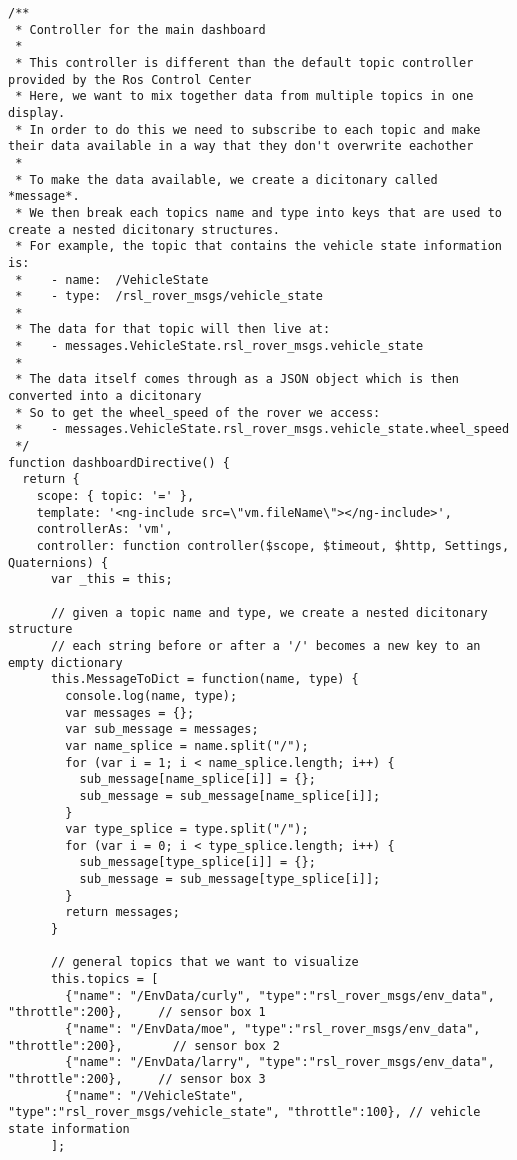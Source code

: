 \begin{lstlisting}[breaklines=true,basicstyle=\tiny]
/**
 * Controller for the main dashboard
 *
 * This controller is different than the default topic controller provided by the Ros Control Center
 * Here, we want to mix together data from multiple topics in one display.
 * In order to do this we need to subscribe to each topic and make their data available in a way that they don't overwrite eachother
 *
 * To make the data available, we create a dicitonary called *message*.
 * We then break each topics name and type into keys that are used to create a nested dicitonary structures.
 * For example, the topic that contains the vehicle state information is:
 *    - name:  /VehicleState
 *    - type:  /rsl_rover_msgs/vehicle_state
 *
 * The data for that topic will then live at:
 *    - messages.VehicleState.rsl_rover_msgs.vehicle_state
 *
 * The data itself comes through as a JSON object which is then converted into a dicitonary
 * So to get the wheel_speed of the rover we access:
 *    - messages.VehicleState.rsl_rover_msgs.vehicle_state.wheel_speed
 */
function dashboardDirective() {
  return {
    scope: { topic: '=' },
    template: '<ng-include src=\"vm.fileName\"></ng-include>',
    controllerAs: 'vm',
    controller: function controller($scope, $timeout, $http, Settings, Quaternions) {
      var _this = this;

      // given a topic name and type, we create a nested dicitonary structure
      // each string before or after a '/' becomes a new key to an empty dictionary
      this.MessageToDict = function(name, type) {
        console.log(name, type);
        var messages = {};
        var sub_message = messages;
        var name_splice = name.split("/");
        for (var i = 1; i < name_splice.length; i++) {
          sub_message[name_splice[i]] = {};
          sub_message = sub_message[name_splice[i]];
        }
        var type_splice = type.split("/");
        for (var i = 0; i < type_splice.length; i++) {
          sub_message[type_splice[i]] = {};
          sub_message = sub_message[type_splice[i]];
        }
        return messages;
      }

      // general topics that we want to visualize
      this.topics = [
        {"name": "/EnvData/curly", "type":"rsl_rover_msgs/env_data", "throttle":200},     // sensor box 1
        {"name": "/EnvData/moe", "type":"rsl_rover_msgs/env_data", "throttle":200},       // sensor box 2
        {"name": "/EnvData/larry", "type":"rsl_rover_msgs/env_data", "throttle":200},     // sensor box 3
        {"name": "/VehicleState", "type":"rsl_rover_msgs/vehicle_state", "throttle":100}, // vehicle state information
      ];
     

\end{lstlisting}
